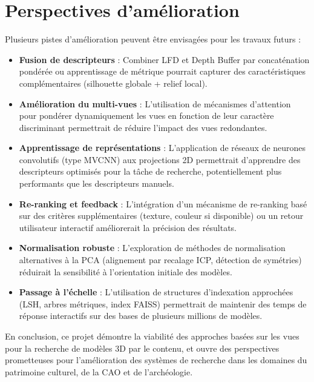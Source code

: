 \documentclass[11pt,a4paper,oneside]{report}
\begin{document}
\section{Perspectives d'amélioration}

Plusieurs pistes d'amélioration peuvent être envisagées pour les travaux futurs :

\begin{itemize}
\item \textbf{Fusion de descripteurs} : Combiner LFD et Depth Buffer par concaténation pondérée ou apprentissage de métrique pourrait capturer des caractéristiques complémentaires (silhouette globale + relief local).

\item \textbf{Amélioration du multi-vues} : L'utilisation de mécanismes d'attention pour pondérer dynamiquement les vues en fonction de leur caractère discriminant permettrait de réduire l'impact des vues redondantes.

\item \textbf{Apprentissage de représentations} : L'application de réseaux de neurones convolutifs (type MVCNN) aux projections 2D permettrait d'apprendre des descripteurs optimisés pour la tâche de recherche, potentiellement plus performants que les descripteurs manuels.

\item \textbf{Re-ranking et feedback} : L'intégration d'un mécanisme de re-ranking basé sur des critères supplémentaires (texture, couleur si disponible) ou un retour utilisateur interactif améliorerait la précision des résultats.

\item \textbf{Normalisation robuste} : L'exploration de méthodes de normalisation alternatives à la PCA (alignement par recalage ICP, détection de symétries) réduirait la sensibilité à l'orientation initiale des modèles.

\item \textbf{Passage à l'échelle} : L'utilisation de structures d'indexation approchées (LSH, arbres métriques, index FAISS) permettrait de maintenir des temps de réponse interactifs sur des bases de plusieurs millions de modèles.
\end{itemize}

En conclusion, ce projet démontre la viabilité des approches basées sur les vues pour la recherche de modèles 3D par le contenu, et ouvre des perspectives prometteuses pour l'amélioration des systèmes de recherche dans les domaines du patrimoine culturel, de la CAO et de l'archéologie.




\end{document}
